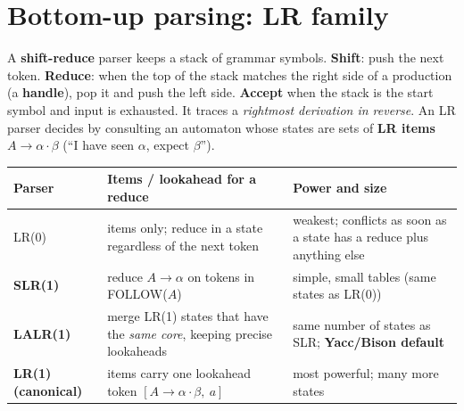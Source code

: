 \documentclass[10pt,a4paper,openany,oneside]{report}
\newcommand{\prio}[1]{\texorpdfstring{\ifcase#1\or{\color{gold}\ding{72}}\or{\color{gold}\ding{72}\ding{72}}\or{\color{gold}\ding{72}\ding{72}\ding{72}}\fi}{}}
\begin{document}
\section{Bottom-up parsing: LR family \prio{3}}
\begin{mustbox}
A \textbf{shift-reduce} parser keeps a stack of grammar symbols. \textbf{Shift}: push the next token. \textbf{Reduce}: when the top of the stack matches the right side of a production (a \textbf{handle}), pop it and push the left side. \textbf{Accept} when the stack is the start symbol and input is exhausted. It traces a \emph{rightmost derivation in reverse}. An LR parser decides by consulting an automaton whose states are sets of \textbf{LR items} $A\to\alpha\cdot\beta$ (``I have seen $\alpha$, expect $\beta$'').
\end{mustbox}
\begin{center}\small
\begin{xltabular}{\textwidth}{@{}L{2.6cm}L{4.6cm}Y@{}}
\toprule
\textbf{Parser} & \textbf{Items / lookahead for a reduce} & \textbf{Power and size}\\
\midrule\endhead
LR(0) & items only; reduce in a state regardless of the next token & weakest; conflicts as soon as a state has a reduce plus anything else\\
\textbf{SLR(1)} & reduce $A\to\alpha$ on tokens in FOLLOW($A$) & simple, small tables (same states as LR(0))\\
\textbf{LALR(1)} & merge LR(1) states that have the \emph{same core}, keeping precise lookaheads & same number of states as SLR; \textbf{Yacc/Bison default}\\
\textbf{LR(1) (canonical)} & items carry one lookahead token $[A\to\alpha\cdot\beta,\ a]$ & most powerful; many more states\\
\bottomrule
\end{xltabular}
\end{center}
\begin{center}
\end{center}
\end{document}
